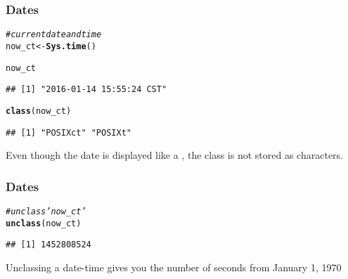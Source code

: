 \documentclass[12pt]{beamer}\usepackage[]{graphicx}\usepackage[]{color}
\makeatletter
\newcommand{\hlcom}[1]{\textcolor[rgb]{0.678,0.584,0.686}{\textit{#1}}}%
\newcommand{\hlstd}[1]{\textcolor[rgb]{0.345,0.345,0.345}{#1}}%
\newcommand{\hlkwb}[1]{\textcolor[rgb]{0.69,0.353,0.396}{#1}}%
\newcommand{\hlkwd}[1]{\textcolor[rgb]{0.737,0.353,0.396}{\textbf{#1}}}%
\newenvironment{kframe}{%
 \def\at@end@of@kframe{}%
 \ifinner\ifhmode%
  \def\at@end@of@kframe{\end{minipage}}%
  \begin{minipage}{\columnwidth}%
 \fi\fi%
 \def\FrameCommand##1{\hskip\@totalleftmargin \hskip-\fboxsep
 \colorbox{shadecolor}{##1}\hskip-\fboxsep
     \hskip-\linewidth \hskip-\@totalleftmargin \hskip\columnwidth}%
 \MakeFramed {\advance\hsize-\width
   \@totalleftmargin\z@ \linewidth\hsize
   \@setminipage}}%
 {\par\unskip\endMakeFramed%
 \at@end@of@kframe}
\newenvironment{knitrout}{}{} %
\makeatother
\begin{document}

\begin{frame}[fragile]
\frametitle{ Dates}

\begin{knitrout}\footnotesize
{}\color{fgcolor}\begin{kframe}
\begin{alltt}
\hlcom{# current date and time}
\hlstd{now_ct} \hlkwb{<-} \hlkwd{Sys.time}\hlstd{()}

\hlstd{now_ct}
\end{alltt}
\begin{verbatim}
## [1] "2016-01-14 15:55:24 CST"
\end{verbatim}
\begin{alltt}
\hlkwd{class}\hlstd{(now_ct)}
\end{alltt}
\begin{verbatim}
## [1] "POSIXct" "POSIXt"
\end{verbatim}
\end{kframe}
\end{knitrout}
Even  though the date is displayed like a , the class  is not stored as characters.

\end{frame}


\begin{frame}[fragile]
\frametitle{ Dates}

\begin{knitrout}\footnotesize
{}\color{fgcolor}\begin{kframe}
\begin{alltt}
\hlcom{# unclass 'now_ct'}
\hlkwd{unclass}\hlstd{(now_ct)}
\end{alltt}
\begin{verbatim}
## [1] 1452808524
\end{verbatim}
\end{kframe}
\end{knitrout}
Unclassing a  date-time gives you the number of seconds from January 1, 1970

\end{frame}

\end{document}
